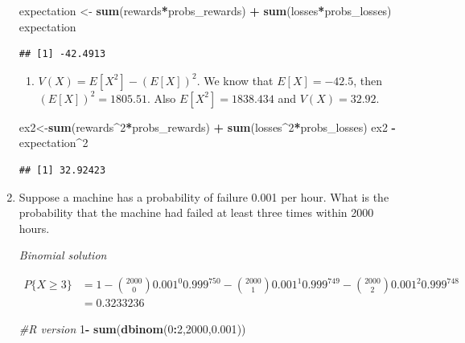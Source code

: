 \documentclass[]{book}
\newenvironment{Shaded}{\begin{snugshade}}{\end{snugshade}}
\newcommand{\CommentTok}[1]{\textcolor[rgb]{0.56,0.35,0.01}{\textit{#1}}}
\newcommand{\DecValTok}[1]{\textcolor[rgb]{0.00,0.00,0.81}{#1}}
\newcommand{\FloatTok}[1]{\textcolor[rgb]{0.00,0.00,0.81}{#1}}
\newcommand{\KeywordTok}[1]{\textcolor[rgb]{0.13,0.29,0.53}{\textbf{#1}}}
\newcommand{\NormalTok}[1]{#1}
\newcommand{\OperatorTok}[1]{\textcolor[rgb]{0.81,0.36,0.00}{\textbf{#1}}}
\newcommand{\StringTok}[1]{\textcolor[rgb]{0.31,0.60,0.02}{#1}}
\providecommand{\tightlist}{%
  \setlength{\itemsep}{0pt}\setlength{\parskip}{0pt}}
\theoremstyle{definition}
\theoremstyle{definition}
\theoremstyle{definition}
\theoremstyle{remark}
\begin{document}
\begin{enumerate}
\begin{Shaded}
\begin{Highlighting}[]
\NormalTok{expectation <-}\StringTok{ }\KeywordTok{sum}\NormalTok{(rewards}\OperatorTok{*}\NormalTok{probs_rewards) }\OperatorTok{+}\StringTok{ }\KeywordTok{sum}\NormalTok{(losses}\OperatorTok{*}\NormalTok{probs_losses)}
\NormalTok{expectation}
\end{Highlighting}
\end{Shaded}

\begin{verbatim}
## [1] -42.4913
\end{verbatim}

  \begin{enumerate}
  \def\labelenumii{\alph{enumii})}
  \setcounter{enumii}{2}
  \tightlist
  \item
    \(V(X) = E[X^2] - (E[X])^2\). We know that \(E[X] = -42.5\), then
    \((E[X])^2 = 1805.51\). Also \(E[X^2] = 1838.434\) and
    \(V(X) = 32.92\).
  \end{enumerate}

\begin{Shaded}
\begin{Highlighting}[]
\NormalTok{ex2<-}\KeywordTok{sum}\NormalTok{(rewards}\OperatorTok{^}\DecValTok{2}\OperatorTok{*}\NormalTok{probs_rewards) }\OperatorTok{+}\StringTok{ }\KeywordTok{sum}\NormalTok{(losses}\OperatorTok{^}\DecValTok{2}\OperatorTok{*}\NormalTok{probs_losses)}
\NormalTok{ex2 }\OperatorTok{-}\StringTok{ }\NormalTok{expectation}\OperatorTok{^}\DecValTok{2}
\end{Highlighting}
\end{Shaded}

\begin{verbatim}
## [1] 32.92423
\end{verbatim}
\item
  Suppose a machine has a probability of failure 0.001 per hour. What is
  the probability that the machine had failed at least three times
  within 2000 hours.

  \emph{Binomial solution}

  \begin{align*}
   P\{X \ge 3\} &= 1 - \binom{2000}{0} 0.001^0 0.999^{750} - \binom{2000}{1} 0.001^1 0.999^{749} - \binom{2000}{2} 0.001^2 0.999^{748} \\
   &= 0.3233236
   \end{align*}

\begin{Shaded}
\begin{Highlighting}[]
\CommentTok{#R version}
\DecValTok{1}\OperatorTok{-}\StringTok{ }\KeywordTok{sum}\NormalTok{(}\KeywordTok{dbinom}\NormalTok{(}\DecValTok{0}\OperatorTok{:}\DecValTok{2}\NormalTok{,}\DecValTok{2000}\NormalTok{,}\FloatTok{0.001}\NormalTok{))}
\end{Highlighting}
\end{Shaded}


\end{enumerate}
\end{document}
